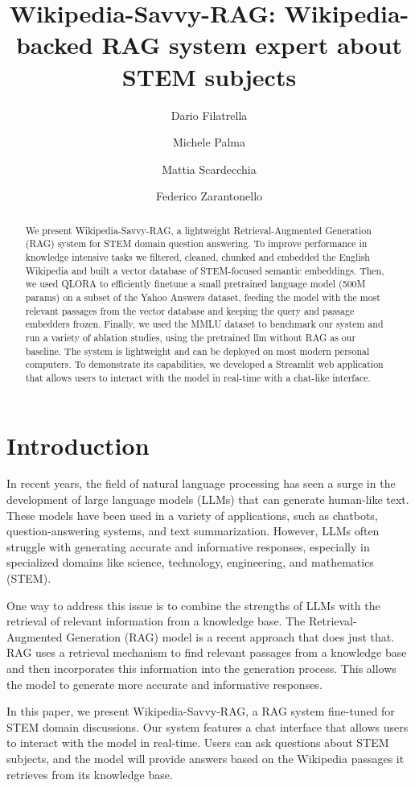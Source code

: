 \documentclass[11pt]{article}
\title{Wikipedia-Savvy-RAG: Wikipedia-backed RAG system expert about STEM subjects}
\author{Dario Filatrella \and Michele Palma \and Mattia Scardecchia \and Federico Zarantonello}
\begin{document}
\maketitle
\begin{abstract}
We present Wikipedia-Savvy-RAG, a lightweight Retrieval-Augmented Generation (RAG) system for
STEM domain question answering. To improve performance in knowledge intensive tasks we filtered, cleaned, 
chunked and embedded the English Wikipedia and built a vector database of STEM-focused semantic embeddings. 
Then, we used QLORA to efficiently finetune a small pretrained language model 
(500M params) on a subset of the Yahoo Answers dataset, feeding the model with the most relevant passages from the 
vector database and keeping the query and passage embedders frozen. Finally, we used the MMLU dataset to 
benchmark our system and run a variety of ablation studies, using the pretrained llm without RAG as our baseline.
The system is lightweight and can be deployed on most modern personal computers. To demonstrate its capabilities,
we developed a Streamlit web application that allows users to interact with the model in real-time with a chat-like interface.

\end{abstract}

\section{Introduction}

In recent years, the field of natural language processing has seen a surge in
the development of large language models (LLMs) that can generate human-like text.
These models have been used in a variety of applications, such as chatbots,
question-answering systems, and text summarization. However, LLMs often struggle
with generating accurate and informative responses, especially in specialized
domains like science, technology, engineering, and mathematics (STEM).

One way to address this issue is to combine the strengths of LLMs with the
retrieval of relevant information from a knowledge base. The Retrieval-Augmented
Generation (RAG) model is a recent approach that does just that. RAG uses a
retrieval mechanism to find relevant passages from a knowledge base and then
incorporates this information into the generation process. This allows the model
to generate more accurate and informative responses.

In this paper, we present Wikipedia-Savvy-RAG, a RAG system fine-tuned for STEM
domain discussions. Our system features a chat interface that allows users to
interact with the model in real-time. Users can ask questions about STEM
subjects, and the model will provide answers based on the Wikipedia passages it
retrieves from its knowledge base. 
\end{document}
